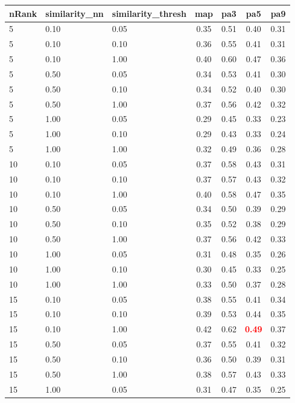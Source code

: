 \documentclass[12pt,a4paper,fleqn]{tufte-handout}
\begin{document}
 
\begin{table}  
\begin{center}  
\scriptsize  
\setlength{\tabcolsep}{.16667em}  
\begin{tabular}{lllcccc}  
nRank & similarity\_nn & similarity\_thresh & map & pa3 & pa5 & pa9 \\  
\hline  
5 & 0.10 & 0.05 & 0.35 & 0.51 & 0.40 & 0.31 \\  
5 & 0.10 & 0.10 & 0.36 & 0.55 & 0.41 & 0.31 \\  
5 & 0.10 & 1.00 & 0.40 & 0.60 & 0.47 & 0.36 \\  
5 & 0.50 & 0.05 & 0.34 & 0.53 & 0.41 & 0.30 \\  
5 & 0.50 & 0.10 & 0.34 & 0.52 & 0.40 & 0.30 \\  
5 & 0.50 & 1.00 & 0.37 & 0.56 & 0.42 & 0.32 \\  
5 & 1.00 & 0.05 & 0.29 & 0.45 & 0.33 & 0.23 \\  
5 & 1.00 & 0.10 & 0.29 & 0.43 & 0.33 & 0.24 \\  
5 & 1.00 & 1.00 & 0.32 & 0.49 & 0.36 & 0.28 \\  
10 & 0.10 & 0.05 & 0.37 & 0.58 & 0.43 & 0.31 \\  
10 & 0.10 & 0.10 & 0.37 & 0.57 & 0.43 & 0.32 \\  
10 & 0.10 & 1.00 & 0.40 & 0.58 & 0.47 & 0.35 \\  
10 & 0.50 & 0.05 & 0.34 & 0.50 & 0.39 & 0.29 \\  
10 & 0.50 & 0.10 & 0.35 & 0.52 & 0.38 & 0.29 \\  
10 & 0.50 & 1.00 & 0.37 & 0.56 & 0.42 & 0.33 \\  
10 & 1.00 & 0.05 & 0.31 & 0.48 & 0.35 & 0.26 \\  
10 & 1.00 & 0.10 & 0.30 & 0.45 & 0.33 & 0.25 \\  
10 & 1.00 & 1.00 & 0.33 & 0.50 & 0.37 & 0.28 \\  
15 & 0.10 & 0.05 & 0.38 & 0.55 & 0.41 & 0.34 \\  
15 & 0.10 & 0.10 & 0.39 & 0.53 & 0.44 & 0.35 \\  
15 & 0.10 & 1.00 & 0.42 & 0.62 & \textbf{\textcolor{red}{0.49}} & 0.37 \\  
15 & 0.50 & 0.05 & 0.37 & 0.55 & 0.41 & 0.32 \\  
15 & 0.50 & 0.10 & 0.36 & 0.50 & 0.39 & 0.31 \\  
15 & 0.50 & 1.00 & 0.38 & 0.57 & 0.43 & 0.33 \\  
15 & 1.00 & 0.05 & 0.31 & 0.47 & 0.35 & 0.25 \\  

\end{tabular}
\end{center}
\end{table}
\end{document}
